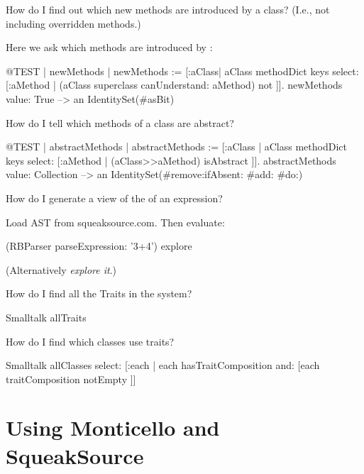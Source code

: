 \documentclass[a4paper,10pt,twoside]{book}
\begin{document}
\begin{faq}
How do I find out which new methods are introduced by a class?  (I.e., not including overridden methods.)
\end{faq}
\answer
Here we ask which methods are introduced by :
\begin{code}{@TEST | newMethods |}
newMethods := [:aClass| aClass methodDict keys select:
	[:aMethod | (aClass superclass canUnderstand: aMethod) not ]].
newMethods value: True --> an IdentitySet(#asBit)
\end{code}

\begin{faq}
How do I tell which methods of a class are abstract?
\end{faq}
\answer
\begin{code}{@TEST | abstractMethods |}
abstractMethods :=
	[:aClass | aClass methodDict keys select:
		[:aMethod | (aClass>>aMethod) isAbstract ]].
abstractMethods value: Collection --> an IdentitySet(#remove:ifAbsent: #add: #do:)
\end{code}

\begin{faq}
How do I generate a view of the  of an expression?
\end{faq}
\answer
Load AST from squeaksource.com. Then evaluate:
\begin{code}{}
(RBParser parseExpression: '3+4') explore
\end{code}
(Alternatively \emph{explore it}.)

\begin{faq}
How do I find all the Traits in the system?
\end{faq}
\answer
\begin{code}{}
Smalltalk allTraits
\end{code}

\begin{faq}
How do I find which classes use traits?
\end{faq}
\answer
\begin{code}{}
Smalltalk allClasses select: [:each | each hasTraitComposition and: [each traitComposition notEmpty ]]
\end{code}

\section{Using Monticello and SqueakSource}
\end{document}
